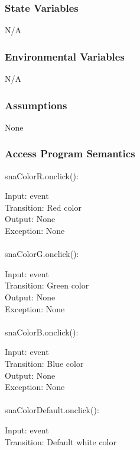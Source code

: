 \documentclass[12pt, titlepage]{article}
\begin{document}
		\subsubsection{State Variables}
		N/A
		
		\subsubsection{Environmental Variables}
		N/A
		
		\subsubsection{Assumptions}
		None
		
		\subsubsection{Access Program Semantics}
		snaColorR.onclick():
		
		Input: event\\
		
		Transition: Red color\\
		
		Output: None\\
		
		Exception: None\\
		\\
		snaColorG.onclick():
		
		Input: event\\
		
		Transition: Green color\\
		
		Output: None\\
		
		Exception: None\\
		\\
		snaColorB.onclick():
		
		Input: event\\
		
		Transition: Blue color\\
		
		Output: None\\
		
		Exception: None\\
		\\
	    snaColorDefault.onclick():
		
		Input: event\\
		
		Transition: Default white color\\
		
\end{document}
